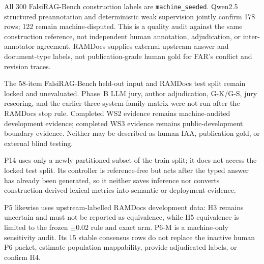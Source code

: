 All 300 FalsiRAG-Bench construction labels are
\texttt{machine\_seeded}. Qwen2.5 structured preannotation and deterministic
weak supervision jointly confirm 178 rows; 122 remain machine-disputed. This
is a quality audit against the same construction reference, not independent
human annotation, adjudication, or inter-annotator agreement. RAMDocs supplies
external upstream answer and document-type labels, not publication-grade human
gold for FAR's conflict and revision traces.

The 58-item FalsiRAG-Bench held-out input and RAMDocs test split remain locked
and unevaluated. Phase~B LLM jury, author adjudication, G-K/G-S, jury rescoring,
and the earlier three-system-family matrix were not run after the RAMDocs stop
rule. Completed WS2 evidence remains machine-audited development evidence;
completed WS3 evidence remains public-development boundary evidence. Neither may be
described as human IAA, publication gold, or external blind testing.

P14 uses only a newly partitioned subset of the train split; it does not access
the locked test split. Its controller is reference-free but acts after the typed
answer has already been generated, so it neither saves inference nor converts
construction-derived lexical metrics into semantic or deployment evidence.

P5 likewise uses upstream-labelled RAMDocs development data: H3 remains
uncertain and must not be reported as equivalence, while H5 equivalence is
limited to the frozen $\pm0.02$ rule and exact arm. P6-M is a machine-only
sensitivity audit. Its 15 stable consensus rows do not replace the inactive
human P6 packet, estimate population mappability, provide adjudicated labels,
or confirm H4.
